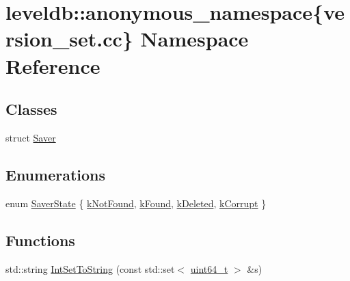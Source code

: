 \hypertarget{namespaceleveldb_1_1anonymous__namespace_02version__set_8cc_03}{}\section{leveldb\+:\+:anonymous\+\_\+namespace\{version\+\_\+set.\+cc\} Namespace Reference}
\label{namespaceleveldb_1_1anonymous__namespace_02version__set_8cc_03}
\subsection*{Classes}
\begin{DoxyCompactItemize}
\item 
struct \hyperlink{structleveldb_1_1anonymous__namespace_02version__set_8cc_03_1_1_saver}{Saver}
\end{DoxyCompactItemize}
\subsection*{Enumerations}
\begin{DoxyCompactItemize}
\item 
enum \hyperlink{namespaceleveldb_1_1anonymous__namespace_02version__set_8cc_03_aa77f56e7bee115a7e23642d102c7e9fb}{Saver\+State} \{ \hyperlink{namespaceleveldb_1_1anonymous__namespace_02version__set_8cc_03_aa77f56e7bee115a7e23642d102c7e9fba49b40ce22eb520847aef2355e3b77628}{k\+Not\+Found}, 
\hyperlink{namespaceleveldb_1_1anonymous__namespace_02version__set_8cc_03_aa77f56e7bee115a7e23642d102c7e9fba88e4461d441a955d3dfc35c1e02e3c3e}{k\+Found}, 
\hyperlink{namespaceleveldb_1_1anonymous__namespace_02version__set_8cc_03_aa77f56e7bee115a7e23642d102c7e9fbaf112c18b9adc3c99d767d9c79a58b133}{k\+Deleted}, 
\hyperlink{namespaceleveldb_1_1anonymous__namespace_02version__set_8cc_03_aa77f56e7bee115a7e23642d102c7e9fba42c87fee34163d63d44a446ae292c92a}{k\+Corrupt}
 \}
\end{DoxyCompactItemize}
\subsection*{Functions}
\begin{DoxyCompactItemize}
\item 
std\+::string \hyperlink{namespaceleveldb_1_1anonymous__namespace_02version__set_8cc_03_a46ad79c264a874d79196cdbd5e014a83}{Int\+Set\+To\+String} (const std\+::set$<$ \hyperlink{stdint_8h_aaa5d1cd013383c889537491c3cfd9aad}{uint64\+\_\+t} $>$ \&s)
\end{DoxyCompactItemize}


